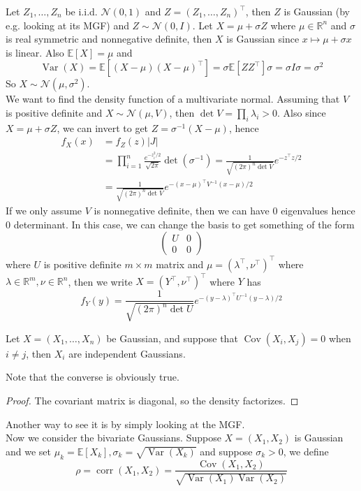 Let $Z_1,\ldots,Z_n$ be i.i.d. $\mathcal N(0,1)$ and $Z=(Z_1,\ldots,Z_n)^\top$, then $Z$ is Gaussian (by e.g. looking at its MGF) and $Z\sim\mathcal N(0,I)$.
Let $X=\mu+\sigma Z$ where $\mu\in\mathbb R^n$ and $\sigma$ is real symmetric and nonnegative definite, then $X$ is Gaussian since $x\mapsto \mu+\sigma x$ is linear.
Also $\mathbb E[X]=\mu$ and
$$\operatorname{Var}(X)=\mathbb E[(X-\mu)(X-\mu)^\top]=\sigma\mathbb E[ZZ^\top]\sigma=\sigma I\sigma=\sigma^2$$
So $X\sim\mathcal N(\mu,\sigma^2)$.\\
We want to find the density function of a multivariate normal.
Assuming that $V$ is positive definite and $X\sim\mathcal N(\mu,V)$, then $\det V=\prod_i\lambda_i>0$.
Also since $X=\mu+\sigma Z$, we can invert to get $Z=\sigma^{-1}(X-\mu)$, hence
\begin{align*}
    f_X(x)&=f_Z(z)|J|\\
    &=\prod_{i=1}^n\frac{e^{-z_i^2/2}}{\sqrt{2\pi}}\det(\sigma^{-1})=\frac{1}{\sqrt{(2\pi)^n\det V}}e^{-z^\top z/2}\\
    &=\frac{1}{\sqrt{(2\pi)^n\det V}}e^{-(x-\mu)^\top V^{-1}(x-\mu)/2}
\end{align*}
If we only assume $V$ is nonnegative definite, then we can have $0$ eigenvalues hence $0$ determinant.
In this case, we can change the basis to get something of the form
$$\begin{pmatrix}
    U&0\\
    0&0
\end{pmatrix}$$
where $U$ is positive definite $m\times m$ matrix and $\mu=(\lambda^\top,\nu^\top)^\top$ where $\lambda\in\mathbb R^m,\nu\in\mathbb R^n$, then we write $X=(Y^\top,\nu^\top)^\top$ where $Y$ has
$$f_Y(y)=\frac{1}{\sqrt{(2\pi)^n\det U}}e^{-(y-\lambda)^\top U^{-1}(y-\lambda)/2}$$
\begin{proposition}
    Let $X=(X_1,\ldots,X_n)$ be Gaussian, and suppose that $\operatorname{Cov}(X_i,X_j)=0$ when $i\neq j$, then $X_i$ are independent Gaussians.
\end{proposition}
Note that the converse is obviously true.
\begin{proof}
    The covariant matrix is diagonal, so the density factorizes.
\end{proof}
Another way to see it is by simply looking at the MGF.\\
Now we consider the bivariate Gaussians.
Suppose $X=(X_1,X_2)$ is Gaussian and we set $\mu_k=\mathbb E[X_k],\sigma_k=\sqrt{\operatorname{Var}(X_k)}$ and suppose $\sigma_k>0$, we define
$$\rho=\operatorname{corr}(X_1,X_2)=\frac{\operatorname{Cov}(X_1,X_2)}{\sqrt{\operatorname{Var}(X_1)\operatorname{Var}(X_2)}}$$
